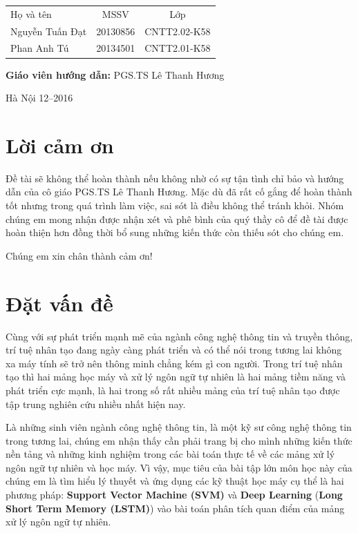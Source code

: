 \documentclass[a4paper,12pt]{report}
\begin{document}
\begin{longtable}{l c c}

Họ và tên & MSSV  & Lớp\\

Nguyễn Tuấn Đạt & 20130856 & CNTT2.02-K58 \\
Phan Anh Tú &   20134501 & CNTT2.01-K58\\

\end{longtable}

\hspace{1cm}\fontsize{14}{16}\selectfont \textbf{Giáo viên hướng dẫn: }PGS.TS Lê Thanh Hương \\[2cm]
\begin{center}
\fontsize{16}{19}\selectfont Hà Nội 12--2016

\end{center}
\newpage
\tableofcontents
\listoftables
\listoffigures

\chapter*{Lời cảm ơn}
{}
Đề tài sẽ không thể hoàn thành nếu không nhờ có sự tận tình chỉ bảo và hướng dẫn của cô giáo PGS.TS Lê Thanh Hương. Mặc dù đã rất cố gắng để hoàn thành tốt nhưng trong quá trình làm việc, sai sót là điều không thể tránh khỏi. Nhóm chúng em mong nhận được nhận xét và phê bình của quý thầy cô để đề tài được hoàn thiện hơn đồng thời bổ sung những kiến thức còn thiếu sót cho chúng em.


Chúng em xin chân thành cảm ơn!

\chapter{Đặt vấn đề }
Cùng với sự phát triển mạnh mẽ của ngành công nghệ thông tin và truyền thông, trí tuệ nhân tạo đang ngày càng phát triển và có thể nói trong tương lai không xa máy tính sẽ trở nên thông minh chẳng kém gì con người. Trong trí tuệ nhân tạo thì hai mảng học máy và xử lý ngôn ngữ tự nhiên là hai mảng tiềm năng và phát triển cực mạnh, là hai trong số rất nhiều mảng của trí tuệ nhân tạo được tập trung nghiên cứu nhiều nhất hiện nay.


Là những sinh viên ngành công nghệ thông tin, là một kỹ sư công nghệ thông tin trong tương lai, chúng em nhận thấy cần phải trang bị cho mình những kiến thức nền tảng và những kinh nghiệm trong các bài toán thực tế về các mảng xử lý ngôn ngữ tự nhiên và học máy. Vì vậy, mục tiêu của bài tập lớn môn học này của chúng em là tìm hiểu lý thuyết và ứng dụng các kỹ thuật học máy cụ thể là hai phương pháp: \textbf{Support Vector Machine (SVM)} và \textbf{Deep Learning} (\textbf{Long Short Term Memory (LSTM)}) vào bài toán phân tích quan điểm của mảng xử lý ngôn ngữ tự nhiên.
\end{document}
